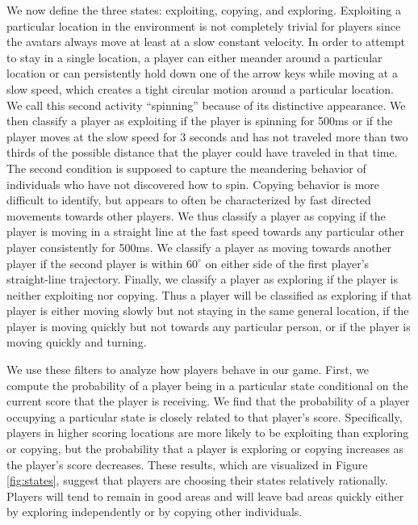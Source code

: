 \documentclass[12pt,letterpaper]{article}
\begin{document}
We now define the three states: exploiting, copying, and exploring.
Exploiting a particular location in the environment is not completely
trivial for players since the avatars always move at least at a slow
constant velocity.  In order to attempt to stay in a single location,
a player can either meander around a particular location or can
persistently hold down one of the arrow keys while moving at a slow
speed, which creates a tight circular motion around a particular
location.  We call this second activity ``spinning'' because of its
distinctive appearance.  We then classify a player as exploiting if
the player is spinning for 500ms or if the player moves at the slow
speed for 3 seconds and has not traveled more than two thirds of the
possible distance that the player could have traveled in that time.
The second condition is supposed to capture the meandering behavior of
individuals who have not discovered how to spin.  Copying behavior is
more difficult to identify, but appears to often be characterized by
fast directed movements towards other players.  We thus classify a
player as copying if the player is moving in a straight line at the
fast speed towards any particular other player consistently for 500ms.
We classify a player as moving towards another player if the second
player is within $60^\circ$ on either side of the first player's
straight-line trajectory.  Finally, we classify a player as exploring
if the player is neither exploiting nor copying.  Thus a player will
be classified as exploring if that player is either moving slowly but
not staying in the same general location, if the player is moving
quickly but not towards any particular person, or if the player is
moving quickly and turning.

We use these filters to analyze how players behave in our game.
First, we compute the probability of a player being in a particular
state conditional on the current score that the player is receiving.
We find that the probability of a player occupying a particular state
is closely related to that player's score.  Specifically, players in
higher scoring locations are more likely to be exploiting than
exploring or copying, but the probability that a player is exploring
or copying increases as the player's score decreases.  These results,
which are visualized in Figure \ref{fig:states}, suggest that players
are choosing their states relatively rationally.  Players will tend to
remain in good areas and will leave bad areas quickly either by
exploring independently or by copying other individuals.
\end{document}
